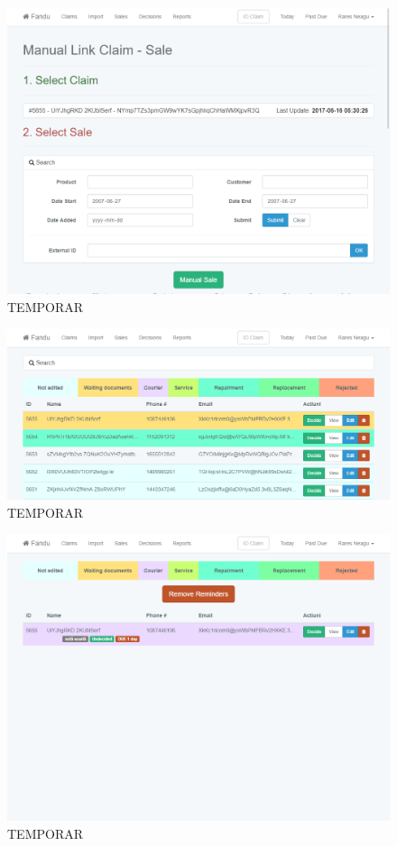 	\begin{figure}
		\includegraphics[width=\linewidth]{../imagini/claims_match_sale.png}
		\caption{TEMPORAR}
		\label{fig:TEMP}
	\end{figure}
	\begin{figure}
		\includegraphics[width=\linewidth]{../imagini/claims_normal.png}
		\caption{TEMPORAR}
		\label{fig:TEMP}
	\end{figure}
	\begin{figure}
		\includegraphics[width=\linewidth]{../imagini/claims_reminder_view.png}
		\caption{TEMPORAR}
		\label{fig:TEMP}
	\end{figure}
